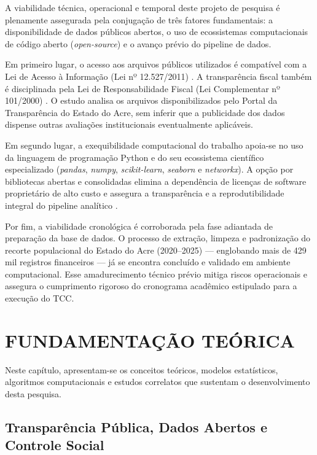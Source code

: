\documentclass[
    12pt,               %
    openright,          %
    oneside,            %
    a4paper,            %
    chapter=TITLE,      %
    sumario=tradicional,%
    english,            %
    brazilian,          %
 ]{abntex2}
\begin{document}
A viabilidade técnica, operacional e temporal deste projeto de pesquisa é plenamente assegurada pela conjugação de três fatores fundamentais: a disponibilidade de dados públicos abertos, o uso de ecossistemas computacionais de código aberto (\textit{open-source}) e o avanço prévio do pipeline de dados.

Em primeiro lugar, o acesso aos arquivos públicos utilizados é compatível com a Lei de Acesso à Informação (Lei nº 12.527/2011) \cite{lai2011}. A transparência fiscal também é disciplinada pela Lei de Responsabilidade Fiscal (Lei Complementar nº 101/2000) \cite{lrf2000}. O estudo analisa os arquivos disponibilizados pelo Portal da Transparência do Estado do Acre, sem inferir que a publicidade dos dados dispense outras avaliações institucionais eventualmente aplicáveis.

Em segundo lugar, a exequibilidade computacional do trabalho apoia-se no uso da linguagem de programação Python e do seu ecossistema científico especializado (\textit{pandas}, \textit{numpy}, \textit{scikit-learn}, \textit{seaborn} e \textit{networkx}). A opção por bibliotecas abertas e consolidadas elimina a dependência de licenças de software proprietário de alto custo e assegura a transparência e a reprodutibilidade integral do pipeline analítico \cite{pereira2025}.

Por fim, a viabilidade cronológica é corroborada pela fase adiantada de preparação da base de dados. O processo de extração, limpeza e padronização do recorte populacional do Estado do Acre (2020--2025) — englobando mais de 429 mil registros financeiros — já se encontra concluído e validado em ambiente computacional. Esse amadurecimento técnico prévio mitiga riscos operacionais e assegura o cumprimento rigoroso do cronograma acadêmico estipulado para a execução do TCC.

\chapter{FUNDAMENTAÇÃO TEÓRICA}\label{sec:fundamentacao}

Neste capítulo, apresentam-se os conceitos teóricos, modelos estatísticos, algoritmos computacionais e estudos correlatos que sustentam o desenvolvimento desta pesquisa.

\section{Transparência Pública, Dados Abertos e Controle Social}\label{sec:transparencia_dados_abertos}
\end{document}
